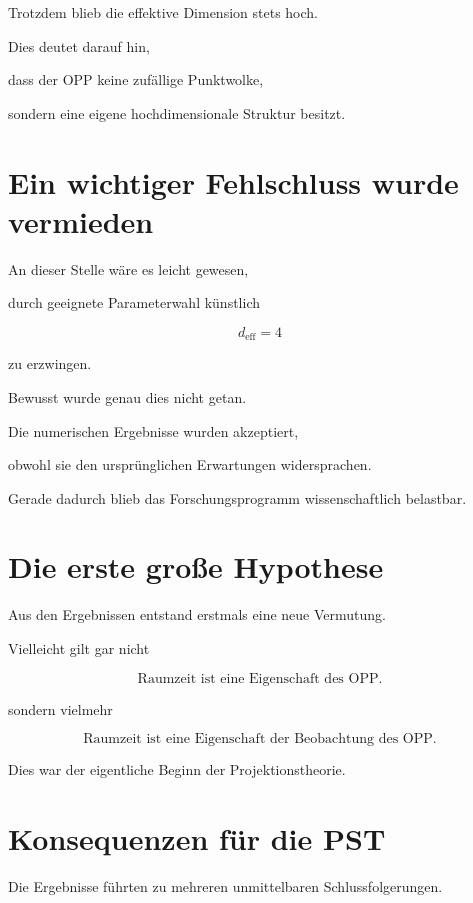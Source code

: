 Trotzdem blieb die effektive Dimension stets hoch.

Dies deutet darauf hin,

dass der OPP keine zufällige Punktwolke,

sondern eine eigene hochdimensionale Struktur besitzt.


\section*{Ein wichtiger Fehlschluss wurde vermieden}

An dieser Stelle wäre es leicht gewesen,

durch geeignete Parameterwahl künstlich

\[
d_{\mathrm{eff}}
=
4
\]

zu erzwingen.

Bewusst wurde genau dies nicht getan.

Die numerischen Ergebnisse wurden akzeptiert,

obwohl sie den ursprünglichen Erwartungen widersprachen.

Gerade dadurch blieb das Forschungsprogramm wissenschaftlich belastbar.


\section*{Die erste große Hypothese}

Aus den Ergebnissen entstand erstmals eine neue Vermutung.

Vielleicht gilt gar nicht

\[
\boxed{
\text{Raumzeit ist eine Eigenschaft des OPP.}
}
\]

sondern vielmehr

\[
\boxed{
\text{Raumzeit ist eine Eigenschaft der Beobachtung des OPP.}
}
\]

Dies war der eigentliche Beginn der Projektionstheorie.


\section*{Konsequenzen für die PST}

Die Ergebnisse führten zu mehreren unmittelbaren Schlussfolgerungen.

